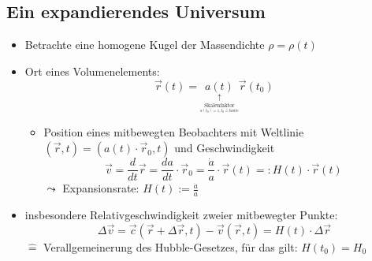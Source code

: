 \subsection{Ein expandierendes Universum}
\begin{itemize}
	\item Betrachte eine homogene Kugel der Massendichte $\rho=\rho(t)$
	\item Ort eines Volumenelements:
		\begin{equation*}
			\vec{r}(t)=\underset{\underset{\underset{a(t_0)=1, t_0\hat{=}\text{heute}}{\text{Skalenfaktor}}}{\uparrow}}{a(t)}\vec{r}(t_0)
		\end{equation*}
		\begin{itemize}
			\item Position eines mitbewegten Beobachters mit Weltlinie $\left(\vec{r},t\right)=\left(a(t)\cdot \vec{r}_0,t\right)$ und Geschwindigkeit
				\begin{equation*}
					\vec{v}=\frac{d}{dt}\vec{r}=\frac{da}{dt}\cdot\vec{r}_0=\frac{\dot{a}}{a}\cdot\vec{r}(t)=:H(t)\cdot\vec{r}(t)
				\end{equation*}
				$\leadsto$ Expansionsrate: $H(t):=\frac{\dot{a}}{a}$
		\end{itemize}
	\item insbesondere Relativgeschwindigkeit zweier mitbewegter Punkte:
		\begin{equation*}
			\Delta\vec{v}=\vec{c}\left(\vec{r}+\Delta\vec{r},t\right)-\vec{v}\left(\vec{r},t\right)=H(t)\cdot\Delta\vec{r}
		\end{equation*}
		$\hat{=}$ Verallgemeinerung des Hubble-Gesetzes, für das gilt: $H(t_0)=H_0$
\end{itemize}
